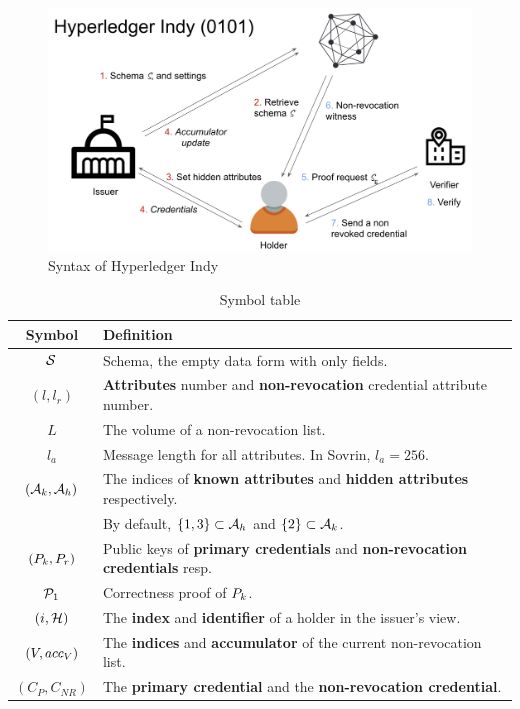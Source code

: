 \documentclass{article}
\begin{document}
\begin{figure}
	\includegraphics[width=\textwidth]{syntax.png}
	\caption{Syntax of Hyperledger Indy}
	\label{fig:indy}
\end{figure}

\begin{table}[h!]
\centering
\begin{tabular}{|c|l|} 
 \hline
 Symbol & Definition \\ \hline
 $\mathcal{S}$ & Schema, the empty data form with only fields. \\
 $(l, l_{r})$ & \textbf{Attributes} number and \textbf{non-revocation} credential attribute number. \\
 $L$ & The volume of a non-revocation list. \\
 $l_{a}$ & Message length for all attributes. In Sovrin, $l_{a}=256$. \\
 $(\mathcal{A}_{k}, \mathcal{A}_{h})$ & The indices of \textbf{known attributes} and \textbf{hidden attributes} respectively.  \\
 & By default, $\{1, 3\}\subset \mathcal{A}_{h}$ and $\{2\}\subset \mathcal{A}_{k} $. \\
 $(P_{k} , P_{r} )$ & Public keys of \textbf{primary credentials} and \textbf{non-revocation credentials} resp.\\
 $\mathcal{P}_{1} $ & Correctness proof of $P_{k} $. \\
 $(i, \mathcal{H} )$ & The \textbf{index} and \textbf{identifier} of a holder in the issuer's view. \\
 $(V, acc_{V})$ & The \textbf{indices} and \textbf{accumulator} of the current non-revocation list.\\ 
 $(C_{P}, C_{NR})$ & The \textbf{primary credential} and the \textbf{non-revocation credential}.\\ \hline
\end{tabular}
\caption{Symbol table}
\label{table:symbol}
\end{table}
\clearpage
\end{document}
